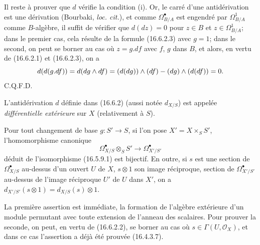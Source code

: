 Il reste à prouver que $d$ vérifie la condition (i). Or, le carré d'une
antidérivation est une dérivation (Bourbaki, \emph{loc. cit.}), et comme
$\Omega_{B/A}^{\bullet}$ est engendré par $\Omega_{B/A}^1$ comme
$B$-algèbre, il suffit de vérifier que $d(dz)=0$ pour $z\in B$ et
$z\in\Omega_{B/A}^1$; dans le premier cas, cela résulte de la formule
(16.6.2.3) avec $g=1$; dans le second, on peut se borner au cas où $z=g.df$
avec $f$, $g$ dans $B$, et alors, en vertu de (16.6.2.1) et (16.6.2.3), on a
\[
  d(d(g.df))=d(dg\wedge df)
  =(d(dg))\wedge(df)-(dg)\wedge(d(df))=0.
\]
\hfill C.Q.F.D.

\begin{definition}[16.6.3]
L'antidérivation $d$ définie dans \textup{(16.6.2)} (aussi notée $d_{X/S}$) est
appelée \emph{différentielle extérieure} sur $X$ (relativement à $S$).
\end{definition}

\begin{proposition}[16.6.4]
\label{IV.16.6.4}
Pour tout changement de base $g:S'\to S$, si l'on pose
$X'=X\times_S S'$, l'homomorphisme canonique
\[
  \varOmega_{X/S}^{\bullet}\otimes_S S'
  \longrightarrow\varOmega_{X'/S'}^{\bullet}
  \tag{16.6.4.1}
  \label{IV.16.6.4.1}
\]
déduit de l'isomorphisme \textup{(16.5.9.1)} est bijectif. En outre, si $s$ est une
section de $\varOmega_{X/S}^{\bullet}$ au-dessus d'un ouvert $U$ de $X$,
$s\otimes1$ son image réciproque, section de $\varOmega_{X'/S'}^{\bullet}$
au-dessus de l'image réciproque $U'$ de $U$ dans $X'$, on a
$d_{X'/S'}(s\otimes1)=d_{X/S}(s)\otimes1$.
\end{proposition}

La première assertion est immédiate, la formation de l'algèbre extérieure
d'un module permutant avec toute extension de l'anneau des scalaires. Pour
prouver la seconde, on peut, en vertu de (16.6.2.2), se borner au cas où
$s\in\Gamma(U,\mathcal{O}_X)$, et dans ce cas l'assertion a déjà été prouvée
(16.4.3.7).

